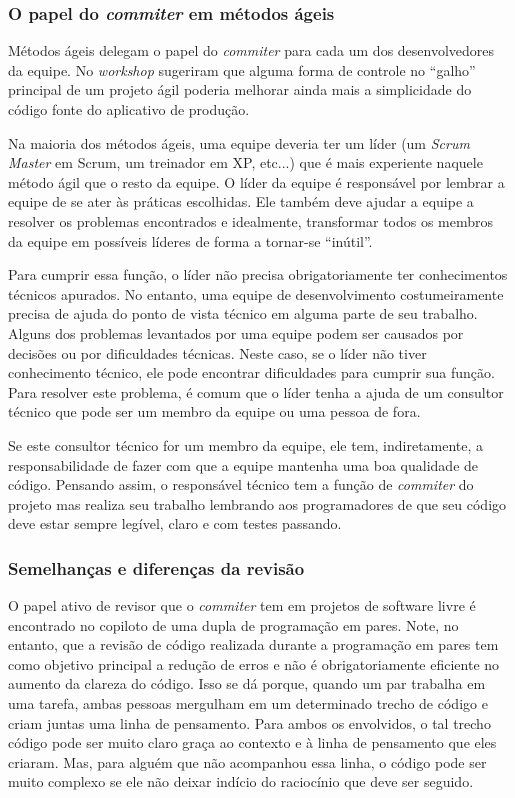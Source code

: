 \subsubsection{O papel do \emph{commiter} em métodos ágeis}

Métodos ágeis delegam o papel do \emph{commiter} para cada um dos
desenvolvedores da equipe. No \emph{workshop} sugeriram que alguma
forma de controle no ``galho'' principal de um projeto ágil poderia
melhorar ainda mais a simplicidade do código fonte do aplicativo de
produção.

Na maioria dos métodos ágeis, uma equipe deveria ter um líder (um
\emph{Scrum Master} em Scrum, um treinador em XP, etc...)  que é mais
experiente naquele método ágil que o resto da equipe. O líder da
equipe é responsável por lembrar a equipe de se ater às práticas
escolhidas. Ele também deve ajudar a equipe a resolver os problemas
encontrados e idealmente, transformar todos os membros da equipe em
possíveis líderes de forma a tornar-se ``inútil''.

Para cumprir essa função, o líder não precisa obrigatoriamente ter
conhecimentos técnicos apurados. No entanto, uma equipe de
desenvolvimento costumeiramente precisa de ajuda do ponto de vista
técnico em alguma parte de seu trabalho. Alguns dos problemas
levantados por uma equipe podem ser causados por decisões ou por
dificuldades técnicas. Neste caso, se o líder não tiver conhecimento
técnico, ele pode encontrar dificuldades para cumprir sua função. Para
resolver este problema, é comum que o líder tenha a ajuda de um
consultor técnico que pode ser um membro da equipe ou uma pessoa de
fora.

Se este consultor técnico for um membro da equipe, ele tem,
indiretamente, a responsabilidade de fazer com que a equipe mantenha
uma boa qualidade de código. Pensando assim, o responsável técnico tem
a função de \emph{commiter} do projeto mas realiza seu trabalho
lembrando aos programadores de que seu código deve estar sempre
legível, claro e com testes passando.

\subsubsection{Semelhanças e diferenças da revisão}

O papel ativo de revisor que o \emph{commiter} tem em projetos de
software livre é encontrado no copiloto de uma dupla de programação em
pares. Note, no entanto, que a revisão de código realizada durante a
programação em pares tem como objetivo principal a redução de erros e
não é obrigatoriamente eficiente no aumento da clareza do código. Isso
se dá porque, quando um par trabalha em uma tarefa, ambas pessoas
mergulham em um determinado trecho de código e criam juntas uma linha
de pensamento. Para ambos os envolvidos, o tal trecho código pode ser
muito claro graça ao contexto e à linha de pensamento que eles
criaram. Mas, para alguém que não acompanhou essa linha, o código pode
ser muito complexo se ele não deixar indício do raciocínio que deve
ser seguido.

